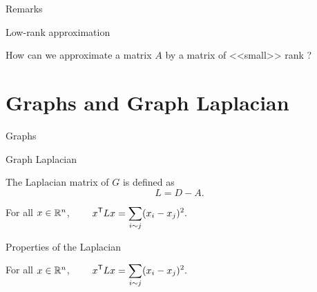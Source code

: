 \documentclass{beamer}
\begin{document}
\begin{frame}[t]{Remarks}
	\grid

\end{frame}

\begin{frame}[t]{Low-rank approximation}
	\grid

	\vspace{-0.2cm}
	\hspace{-0.5cm}How can we approximate a matrix $A$ by a matrix of <<small>> rank ?

\end{frame}

\section{Graphs and Graph Laplacian}

\begin{frame}[t]{Graphs}
	\grid

\end{frame}

\begin{frame}[t]{Graph Laplacian}
	\grid

	\vspace{-0.4cm}
	\begin{definition}
		The Laplacian matrix of $G$ is defined as
		$$
		L = D - A.
		$$
	\end{definition}

	\pause
	\vspace{-0.5cm}
	\begin{exampleblock}{}
		For all $x \in \mathbb{R}^n$,
		$\displaystyle \qquad
		x^{\sT} L x = \sum_{i \sim j} (x_i - x_j)^2.
		\vspace{-0.1cm}
		$
	\end{exampleblock}
\end{frame}


\begin{frame}[t]{Properties of the Laplacian}
	\grid

	\vspace{-0.8cm}
	\begin{exampleblock}{}
		For all $x \in \mathbb{R}^n$,
		$\displaystyle \qquad
		x^{{\sf T}} L x = \sum_{i \sim j} (x_i - x_j)^2.
		$
	\end{exampleblock}


	\pause
\end{frame}
\end{document}
